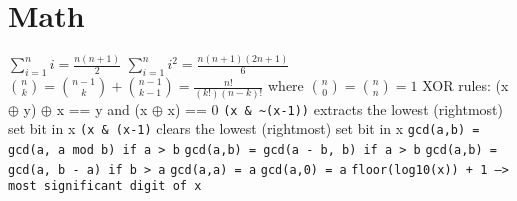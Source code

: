 \documentclass[12pt]{article}
\begin{document}
\section{Math}
\noindent
$\sum\limits_{i=1}^n i = \frac{n(n+1)}{2}$
\newline
\newline
\noindent
$\sum\limits_{i=1}^n i^2 = \frac{n(n+1)(2n+1)}{6}$
\newline
\newline
$\binom{n}{k} = \binom{n-1}{k} + \binom{n-1}{k-1} = \frac{n!}{(k!)(n-k)!}$
where $\binom{n}{0} = \binom{n}{n} = 1$
\newline
\newline
XOR rules: (x $\oplus$ y) $\oplus$ x == y and (x $\oplus$ x) == 0
\newline
\newline
\texttt{(x \& \textasciitilde (x-1))} extracts the lowest (rightmost) set bit in x
\newline
\texttt{(x \& (x-1)} clears the lowest (rightmost) set bit in x
\newline
\newline
\texttt{gcd(a,b) = gcd(a, a mod b) if a > b} \newline
\texttt{gcd(a,b) = gcd(a - b, b) if a > b} \newline
\texttt{gcd(a,b) = gcd(a, b - a) if b > a} \newline
\texttt{gcd(a,a) = a} \newline
\texttt{gcd(a,0) = a} \newline
\newline
\noindent
\texttt{floor(log10(x)) + 1 --> most significant digit of x}


%
\end{document}
